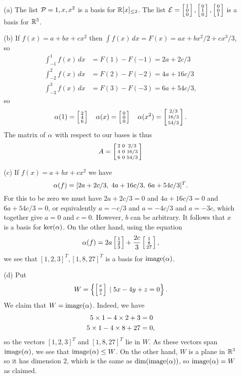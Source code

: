 \documentclass[a4paper]{article}
\begin{document}
\begin{solution}
 \begin{itemize}
  \item[(a)] The list $\mathcal{P}=1,x,x^2$ is a basis for
   ${\mathbb{R}}[x]_{\leq 2}$.  The list
   $\mathcal{E}=\left[\begin{smallmatrix} 1\\0\\0\end{smallmatrix}\right],\left[\begin{smallmatrix} 0\\1\\0\end{smallmatrix}\right],\left[\begin{smallmatrix} 0\\0\\1\end{smallmatrix}\right]$
   is a basis for ${\mathbb{R}}^3$.
  \item[(b)] If $f(x)=a+bx+cx^2$ then
   $\int f(x)\,dx=F(x)=ax+bx^2/2+cx^3/3$, so 
   \begin{align*}
    \int_{-1}^1 f(x)\,dx &= F(1)-F(-1) = 2a+2c/3 \\
    \int_{-2}^2 f(x)\,dx &= F(2)-F(-2) = 4a+16c/3 \\
    \int_{-3}^3 f(x)\,dx &= F(3)-F(-3) = 6a+54c/3,
   \end{align*}
   so
   \[ \alpha(  1)=\left[\begin{smallmatrix} 2\\4\\6\end{smallmatrix}\right] \hspace{1em}
      \alpha(  x)=\left[\begin{smallmatrix} 0\\0\\0\end{smallmatrix}\right] \hspace{1em}
      \alpha(x^2)=\left[\begin{smallmatrix} 2/3\\16/3\\54/3\end{smallmatrix}\right].
   \]
   The matrix of $\alpha$ with respect to our bases is thus
   \[ A = 
       \left[\begin{smallmatrix} 2 & 0 & 2/3 \\ 4 & 0 & 16/3 \\ 6 & 0 & 54/3 \end{smallmatrix}\right]
   \]
  \item[(c)] If $f(x)=a+bx+cx^2$ we have 
   \[ \alpha(f) = [2a+2c/3,\; 4a+16c/3,\; 6a+54c/3]^T. \]
   For this to be zero we must have $2a+2c/3=0$ and
   $4a+16c/3=0$ and $6a+54c/3=0$, or equivalently $a=-c/3$
   and $a=-4c/3$ and $a=-3c$, which together give $a=0$ and
   $c=0$.  However, $b$ can be arbitrary.  It follows that
   $x$ is a basis for $\ker(\alpha)$.  On the other hand, using
   the equation 
   \[ \alpha(f) = 2a \left[\begin{smallmatrix} 1 \\ 2\\ 3\end{smallmatrix}\right] +
               \frac{2c}{3} \left[\begin{smallmatrix} 1 \\ 8 \\ 27 \end{smallmatrix}\right], 
   \]
   we see that $[1,2,3]^T,[1,8,27]^T$ is a basis for
   $\operatorname{image}(\alpha)$.
  \item[(d)] Put 
   \[ W = \left\{\left[\begin{smallmatrix} x\\ y\\ z\end{smallmatrix}\right] \;|\; 5x-4y+z=0\right\} .
   \]
   We claim that $W=\operatorname{image}(\alpha)$.  Indeed, we have
   \begin{align*}
    5\times 1 - 4\times 2 + 3  &= 0 \\
    5\times 1 - 4\times 8 + 27 &= 0, 
   \end{align*}
   so the vectors $[1,2,3]^T$ and $[1,8,27]^T$ lie in $W$.
   As these vectors span $\operatorname{image}(\alpha)$, we see that
   $\operatorname{image}(\alpha)\leq W$.  On the other hand, $W$ is a plane in
   ${\mathbb{R}}^3$ so it has dimension $2$, which is the same as
   $\dim(\operatorname{image}(\alpha))$, so $\operatorname{image}(\alpha)=W$ as claimed.
 \end{itemize}
\end{solution}
\end{document}

